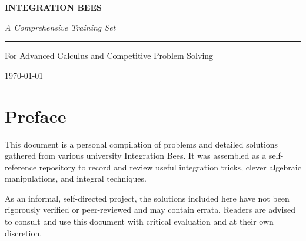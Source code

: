 \documentclass[12pt]{exam}
\begin{document}
\begin{titlepage}
    \centering
    \vspace*{4cm}
    
    {\fontsize{45}{55}\selectfont\bfseries INTEGRATION BEES\par}
    
    \vspace{1.5cm}
    
    {\LARGE \textit{A Comprehensive Training Set}}\par
    
    \vspace{2cm}
    
    \rule{0.6\textwidth}{0.5pt}\par
    
    \vspace{2cm}
    
    {\Large For Advanced Calculus and Competitive Problem Solving}\par
    
    \vfill
    
    {\large \today}\par
\end{titlepage}

\pagebreak

\section*{Preface}

This document is a personal compilation of problems and detailed solutions gathered from various university Integration Bees. It was assembled as a self-reference repository to record and review useful integration tricks, clever algebraic manipulations, and integral techniques.

As an informal, self-directed project, the solutions included here have not been rigorously verified or peer-reviewed and may contain errata. Readers are advised to consult and use this document with critical evaluation and at their own discretion.

\pagebreak

\tableofcontents
\pagebreak












\end{document}
